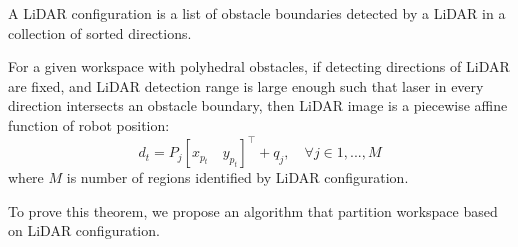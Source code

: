 \begin{definition}
    A LiDAR configuration is a list of obstacle boundaries detected by a LiDAR in a collection of sorted directions.
\end{definition}

\begin{theorem}
    For a given workspace with polyhedral obstacles, if detecting directions of LiDAR are fixed, 
    and LiDAR detection range is large enough such that laser in every direction intersects an obstacle boundary, 
    then LiDAR image is a piecewise affine function of robot position:
    \begin{equation}
        \label{eq:image_func}
        d_t = P_j [x_{p_t} \quad y_{p_t}]^\intercal + q_j, \quad \forall j \in {1, ..., M} 
    \end{equation}
    where $M$ is number of regions identified by LiDAR configuration.
\end{theorem}    

To prove this theorem, we propose an algorithm that partition workspace based on LiDAR configuration.

